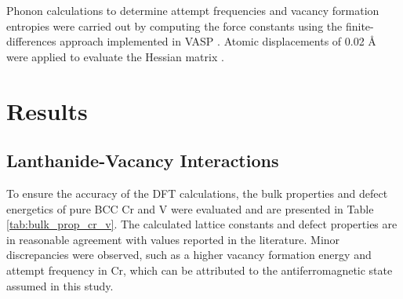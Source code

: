 \documentclass[preprint,12pt]{elsarticle}
\begin{document}
Phonon calculations to determine attempt frequencies and vacancy formation entropies were carried out by computing the force constants using the finite-differences approach implemented in VASP \cite{kresse_ab_1993, kresse_efficient_1996}. Atomic displacements of 0.02 {\AA} were applied to evaluate the Hessian matrix \cite{hafner_ab-initio_2008}.

\section{Results}

\subsection{Lanthanide-Vacancy Interactions}

To ensure the accuracy of the DFT calculations, the bulk properties and defect energetics of pure BCC Cr and V were evaluated and are presented in Table \ref{tab:bulk_prop_cr_v}. The calculated lattice constants and defect properties are in reasonable agreement with values reported in the literature. Minor discrepancies were observed, such as a higher vacancy formation energy and attempt frequency in Cr, which can be attributed to the antiferromagnetic state assumed in this study. 
\end{document}

